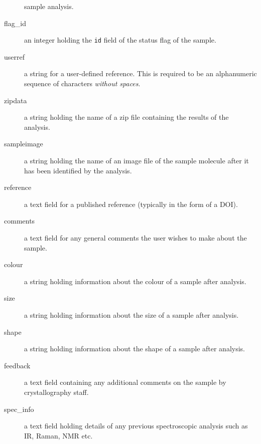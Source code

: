 \documentclass[12pt,twoside]{article}
\begin{document}
\begin{description}
sample analysis.
\item[flag\_id]
an integer holding the \verb=id= field of the status flag of the sample.
\item[userref]
a string for a user-defined reference. This is required to be an
alphanumeric sequence of characters \emph{without spaces}.
\item[zipdata]
a string holding the name of a zip file containing the results of the analysis.
\item[sampleimage]
a string holding the name of an image file of the sample molecule after it
has been identified by the analysis.
\item[reference]
a text field for a published reference (typically in the form of a DOI).
\item[comments]
a text field for any general comments the user wishes to make about the sample.
\item[colour]
a string holding information about the colour of a sample after analysis.
\item[size]
a string holding information about the size of a sample after analysis.
\item[shape]
a string holding information about the shape of a sample after analysis.
\item[feedback]
a text field containing any additional comments on the sample by
crystallography staff.
\item[spec\_info]
a text field holding details of any previous spectroscopic analysis such
as IR, Raman, NMR etc.
\end{description}
\end{document}
